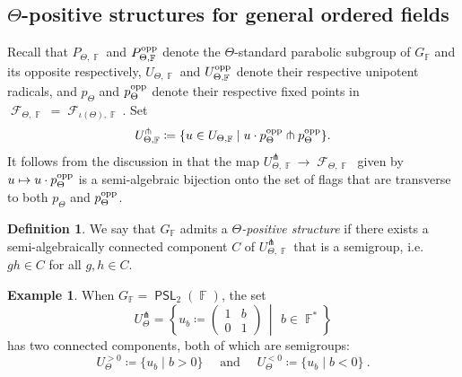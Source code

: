 \documentclass{amsart}
\theoremstyle{plain}
\theoremstyle{definition}
\newtheorem{example}[proposition]{Example}
\newtheorem{definition}[proposition]{Definition}
\DeclareMathOperator{\PSL}{\mathsf{PSL}}
\DeclareMathOperator{\Fc}{\mathcal{F}}
\DeclareMathOperator{\Fb}{{\mathbb{F}}}
\newcommand{\opp}{\textnormal{opp}}
\newcommand{\1}{\mathbf{1}}
\begin{document}
\subsection{%
\texorpdfstring{%
$\Theta$-positive structures for general ordered fields}%
{Theta-positive structures for general ordered fields}}
\label{subsection: PositiveStructures}



Recall that $P_{\Theta,\Fb}$ and $P_{\Theta,\Fb}^\opp$ denote the $\Theta$-standard parabolic subgroup of $G_{\Fb}$ and its opposite respectively, $U_{\Theta,\Fb}$ and $U_{\Theta,\Fb}^\opp$ denote their respective unipotent radicals, and $p_\Theta$ and $p_\Theta^\opp$ denote their respective fixed points in $\Fc_{\Theta,\Fb} =\Fc_{\iota(\Theta),\Fb}$.
Set
\[U_{\Theta,\Fb}^\pitchfork \coloneqq \{u \in U_{\Theta,\Fb} \mid u\cdot p_\Theta^\opp \pitchfork p_\Theta^\opp\}.\]
It follows from the discussion in  that the map $U_{\Theta,\Fb}^\pitchfork\to\Fc_{\Theta,\Fb}$ given by $u\mapsto u\cdot p_\Theta^\opp$ is a semi-algebraic bijection onto the set of flags that are transverse to both $p_\Theta$ and $p_\Theta^\opp$.

\begin{definition}
\label{def: theta positive structure}
We say that $G_{\Fb}$ admits a \emph{$\Theta$-positive structure} if there exists a semi-algebraically connected component $C$ of $U_{\Theta,\Fb}^{\pitchfork}$ that is a semigroup, i.e. $gh \in C$ for all $g,h \in C$.
\end{definition}


\begin{example}
    When $G_{\Fb} = \PSL_2(\Fb)$, the set
    \[U_\Theta^\pitchfork = \left\{u_b \coloneqq \left( \begin{matrix} 1 & b\\ 0 & 1\end{matrix} \right)\,\middle\vert\, \ b\in \Fb^*\right\}\]
    has two connected components, both of which are semigroups:
    \[U_\Theta^{>0} \coloneqq \{ u_b\mid b>0\} \quad \textrm{ and } \quad U_\Theta^{<0} \coloneqq \{u_b\mid b<0\}~.\]
\end{example}
\end{document}
